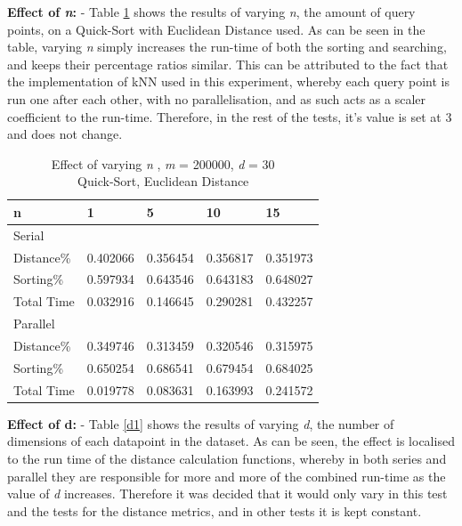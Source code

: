 \documentclass[a4paper,twoside,11pt]{report}
\begin{document}
\textbf{Effect of \textit{n}:} - Table \ref{n1} shows the results of varying \textit{n}, the amount of query points, on a Quick-Sort with Euclidean Distance used. As can be seen in the table, varying \textit{n} simply increases the run-time of both the sorting and searching, and keeps their percentage ratios similar. This can be attributed to the fact that the implementation of kNN used in this experiment, whereby each query point is run one after each other, with no parallelisation, and as such acts as a scaler coefficient to the run-time. Therefore, in the rest of the tests, it's value is set at 3 and does not change.
\begin{table}[h]
	\centering
		\begin{tabular}{lllll}
			\hline
			n          & 1        & 5        & 10       & 15       \\ \hline \hline
			Serial\\ \hline
			Distance\%   & 0.402066 & 0.356454 & 0.356817 & 0.351973 \\
			Sorting\%    & 0.597934 & 0.643546 & 0.643183 & 0.648027 \\
			Total Time & 0.032916 & 0.146645 & 0.290281 & 0.432257 \\ \hline
			Parallel\\ \hline
			Distance\%   & 0.349746 & 0.313459 & 0.320546 & 0.315975 \\
			Sorting\%    & 0.650254 & 0.686541 & 0.679454 & 0.684025 \\
			Total Time & 0.019778 & 0.083631 & 0.163993 & 0.241572 \\ \hline
		\end{tabular}%

	\caption{Effect of varying \textit{n} , \textit{m} = 200000, \textit{d} = 30\\
	Quick-Sort, Euclidean Distance}
	\label{n1}
\end{table}

\textbf{Effect of d:} - Table \ref{d1} shows the results of varying \textit{d}, the number of dimensions of each datapoint in the dataset. As can be seen, the effect is localised to the run time of the distance calculation functions, whereby in both series and parallel they are responsible for more and more of the combined run-time as the value of \textit{d} increases. Therefore it was decided that it would only vary in this test and the tests for the distance metrics, and in other tests it is kept constant.
\end{document}
